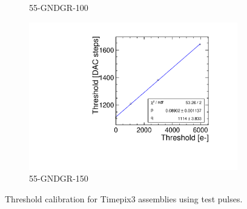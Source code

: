 \begin{figure}[htbp]
\begin{subfigure}[b]{0.45\textwidth}
    \caption{55-GNDGR-100}
  \end{subfigure} \hfill
  \begin{subfigure}[b]{0.45\textwidth}
    \includegraphics[width=\textwidth]{./figures/Calibration/THLcalibration_W0005_F01.pdf}
    \caption{55-GNDGR-150}
  \end{subfigure}
  \caption{Threshold calibration for Timepix3 assemblies using test pulses.}
  \label{fig:Timepix3_THL_Calibration}
\end{figure}


